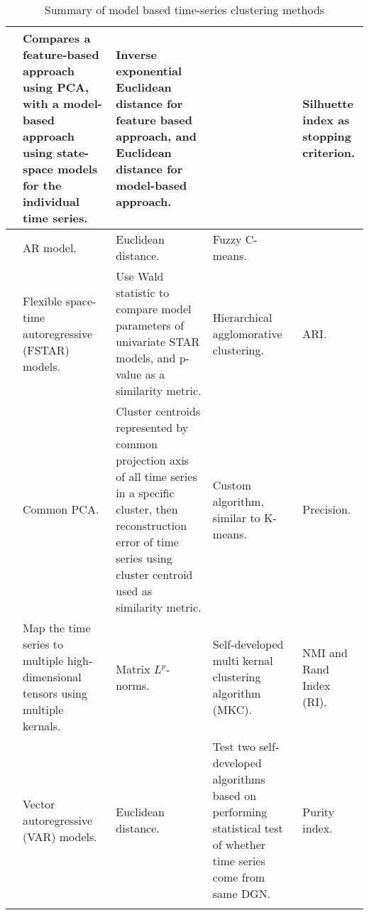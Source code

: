 \begin{longtable}{p{}p{}p{}p{}p{}}
    \cite{load_tsc_state_space_model}       & Compares a feature-based approach using PCA, with a model-based approach using state-space models for the individual time series.& Inverse exponential Euclidean distance for feature based approach, and Euclidean distance for model-based approach.& & Silhuette index as stopping criterion.\\ \hline
    \cite{struct_damage_ar_fuzzy_c_means}   & AR model.& Euclidean distance.& Fuzzy C-means.& \\ \hline
    \cite{fstar_hac_tsc}                    & Flexible space-time autoregressive (FSTAR) models.& Use Wald statistic to compare model parameters of univariate STAR models, and p-value as a similarity metric.& Hierarchical agglomorative clustering.& ARI.\\ \hline
    \cite{multivariate_tsc_common_pca}      & Common PCA.& Cluster centroids represented by common projection axis of all time series in a specific cluster, then reconstruction error of time series using cluster centroid used as similarity metric.& Custom algorithm, similar to K-means.& Precision.\\ \hline
    \cite{tensor_multi_elastic_kernel_tsc}  & Map the time series to multiple high-dimensional tensors using multiple kernals.& Matrix $L^p$-norms.& Self-developed multi kernal clustering algorithm (MKC).& NMI and Rand Index (RI).\\ \hline
    \cite{var_multivar_tsc}                 & Vector autoregressive (VAR) models.& Euclidean distance.& Test two self-developed algorithms based on performing statistical test of whether time series come from same DGN. & Purity index.\\ \hline
    \hline
    \caption{Summary of model based time-series clustering methods}
    \label{tab:machine_learning_wt_cm_summary}
\end{longtable}


